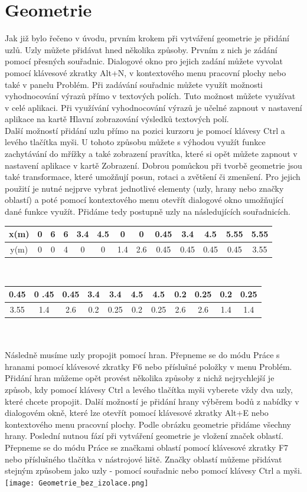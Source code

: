 \documentclass[a4paper, oneside]{article}
\begin{document}
\section{Geometrie}
\indent Jak již bylo řečeno v úvodu, prvním krokem při vytváření geometrie je přidání uzlů. Uzly můžete přidávat hned několika způsoby. Prvním z nich je zádání pomocí přesných souřadnic. Dialogové okno pro jejich zadání můžete vyvolat pomocí klávesové zkratky Alt+N, v kontextového menu pracovní plochy nebo také v panelu Problém. Při zadávání souřadnic můžete využít možnosti vyhodnocování výrazů přímo v textových polích. Tuto možnost můžete využívat v celé aplikaci. Při využívání vyhodnocování výrazů je učelné zapnout v nastavení aplikace na kartě Hlavní zobrazování výsledků textových polí.\\
\indent Další možností přidání uzlu přímo na pozici kurzoru je pomocí klávesy Ctrl a levého tlačítka myši. U tohoto způsobu můžete s výhodou využít funkce zachytávání do mřížky a také zobrazení pravítka, které si opět můžete zapnout v nastavení aplikace v kartě Zobrazení. Dobrou pomůckou při tvorbě geometrie jsou také transformace, které umožňují posun, rotaci a zvětšení či zmenšení. Pro jejich použití je nutné nejprve vybrat jednotlivé elementy (uzly, hrany nebo značky oblastí) a poté pomocí kontextového menu otevřít dialogové okno umožňující dané funkce využít. Přidáme tedy postupně uzly na následujících souřadnicích.\\
\begin{tabular}{|c|c|c|c|c|c|c|c|c|c|c|c|c|}
\hline
x(m) & 0 & 6 & 6 & 3.4 & 4.5 & 0 & 0 & 0.45 & 3.4 & 4.5 & 5.55 & 5.55\\
\hline
y(m) & 0 & 0 & 4 & 0 & 0 & 1.4 & 2.6 & 0.45 & 0.45 & 0.45 & 0.45 & 3.55\\
\hline 
\end{tabular} \\
\begin{tabular}{|c|c|c|c|c|c|c|c|c|c|c|}
\hline
 0.45 &0 .45 & 0.45 & 3.4 & 3.4 & 4.5 & 4.5 & 0.2 & 0.25 & 0.2 & 0.25\\
\hline
 3.55 & 1.4 & 2.6 & 0.2 & 0.25 & 0.2 & 0.25 & 2.6 & 2.6 & 1.4 & 1.4\\
\hline 
\end{tabular} \\
\\
\indent Následně musíme uzly propojit pomocí hran. Přepneme se do módu Práce s hranami pomocí klávesové zkratky F6 nebo příslušné položky v menu Problém. Přidání hran můžeme opět provést několika způsoby z nichž nejrychlejší je způsob, kdy pomocí klávesy Ctrl a levého tlačítka myši vyberete vždy dva uzly, které chcete propojit. Další možností je přidání hrany výběrem bodů z nabídky v dialogovém okně, které lze otevřít pomocí klávesové zkratky Alt+E nebo kontextového menu pracovní plochy. Podle obrázku geometrie přidáme všechny hrany. Poslední nutnou fází při vytváření geometrie je vložení značek oblastí. Přepneme se do módu Práce se značkami oblastí pomocí klávesové zkratky F7 nebo příslušného tlačítka v nástrojové liště. Značky oblastí můžeme přidávat stejným způsobem jako uzly - pomocí souřadnic nebo pomocí klávesy Ctrl a myši.\\
\texttt{[image: Geometrie\_bez\_izolace.png]}\\
\end{document}
